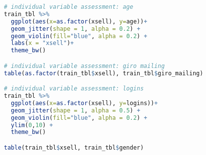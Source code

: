 \begin{lstlisting}[language=R,caption={Main analysis}, label=lst_main]
# individual variable assessment: age
train_tbl %>% 
  ggplot(aes(x=as.factor(xsell), y=age))+
  geom_jitter(shape = 1, alpha = 0.2) +
  geom_violin(fill="blue", alpha = 0.2) +
  labs(x = "xsell")+
  theme_bw()

# individual variable assessment: giro mailing
table(as.factor(train_tbl$xsell), train_tbl$giro_mailing)

# individual variable assessment: logins
train_tbl %>% 
  ggplot(aes(x=as.factor(xsell), y=logins))+
  geom_jitter(shape = 1, alpha = 0.5) +
  geom_violin(fill="blue", alpha = 0.2) +
  ylim(0,10) +
  theme_bw()

table(train_tbl$xsell, train_tbl$gender)
      
\end{lstlisting}